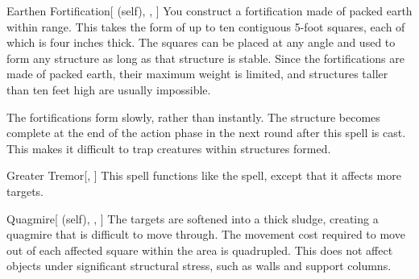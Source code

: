 \lowercase{\hypertarget{spell:Earthen Fortification}{}}\label{spell:Earthen Fortification}
\begin{attuneability}[Rank 4]{\hypertarget{spell:Earthen Fortification}{Earthen Fortification}}[ (self), , ]
\targetrule
You construct a fortification made of packed earth within \rngmed range.
This takes the form of up to ten contiguous 5-foot squares, each of which is four inches thick.
The squares can be placed at any angle and used to form any structure as long as that structure is stable.
Since the fortifications are made of packed earth, their maximum weight is limited, and structures taller than ten feet high are usually impossible.

The fortifications form slowly, rather than instantly.
The structure becomes complete at the end of the action phase in the next round after this spell is cast.
This makes it difficult to trap creatures within structures formed.
\end{attuneability}
\vspace{0.25em}



\lowercase{\hypertarget{spell:Greater Tremor}{}}\label{spell:Greater Tremor}
\begin{freeability}[Rank 4]{\hypertarget{spell:Greater Tremor}{Greater Tremor}}[, ]
This spell functions like the  spell, except that it affects more targets.
\end{freeability}
\vspace{0.25em}



\lowercase{\hypertarget{spell:Quagmire}{}}\label{spell:Quagmire}
\begin{attuneability}[Rank 4]{\hypertarget{spell:Quagmire}{Quagmire}}[ (self), , ]
The targets are softened into a thick sludge, creating a quagmire that is difficult to move through.
The movement cost required to move out of each affected square within the area is quadrupled.
This does not affect objects under significant structural stress, such as walls and support columns.
\end{attuneability}
\vspace{0.25em}



